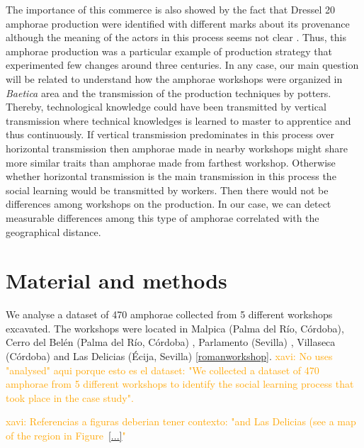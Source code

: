 \documentclass[review]{elsarticle}
\newcommand{\memo}[2]{\textcolor{#1}{#2}}
\newcommand{\xavi}[1]{\memo{orange}{xavi: #1\\}}
\begin{document}
The importance of this commerce is also showed by the fact that Dressel 20 amphorae production were identified with different marks about its provenance although the meaning of the actors in this process seems not clear \citep{coto-sarmiento_maria_bayesian_????}. Thus, this amphorae production was a particular example of production strategy that experimented few changes around three centuries. In any case, our main question will be related to understand how the amphorae workshops were organized in \textit{Baetica} area and the transmission of the production techniques by potters. Thereby, technological knowledge could have been transmitted by vertical transmission where technical knowledges is learned to master to apprentice and thus continuously. If vertical transmission predominates in this process over horizontal transmission then amphorae made in nearby workshops might share more similar traits than amphorae made from farthest workshop. Otherwise whether horizontal transmission is the main transmission in this process the social learning would be transmitted by workers. Then there would not be differences among workshops on the production. In our case, we can detect measurable differences among this type of amphorae correlated with the geographical distance.


\section{Material and methods}

We analyse a dataset of 470 amphorae collected from 5 different workshops excavated. The workshops were located in Malpica (Palma del R\'io, C\'ordoba), Cerro del Bel\'en (Palma del R\'io, C\'ordoba) \citep{diaz_trujillo_excavacion_1992}, Parlamento (Sevilla) \citep{garcia_vargas_anforas_2000}, Villaseca (C\'ordoba)\citep{garcia_vargas_enrique_excavacion_????} and Las Delicias (\'Ecija, Sevilla) \citep{fernandez_excavacion_2001,_atelier_2014} \ref{romanworkshop}.
\xavi{No uses "analysed" aqui porque esto es el dataset: "We collected a dataset of 470 amphorae from 5 different workshops to identify the social learning process that took place in the case study".}

\xavi{Referencias a figuras deberian tener contexto: "and Las Delicias (see a map of the region in Figure~\ref{...}"}
\end{document}
